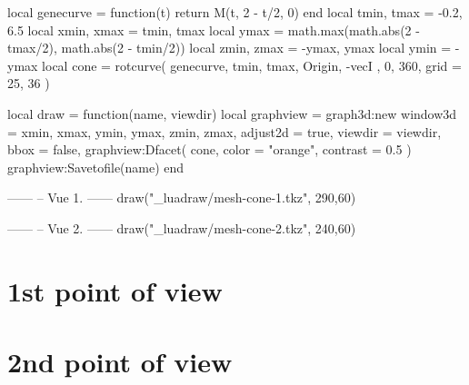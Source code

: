\documentclass[varwidth]{standalone}
\begin{document}
\begin{luacode*}
local genecurve = function(t)
  return M(t, 2 - t/2, 0)
end
local tmin, tmax = -0.2, 6.5
local xmin, xmax = tmin, tmax
local ymax = math.max(math.abs(2 - tmax/2), math.abs(2 - tmin/2))
local zmin, zmax = -ymax, ymax
local ymin = -ymax
local cone = rotcurve(
  genecurve, tmin, tmax,
  {
    Origin, -vecI
  },
  0, 360,
  {
    grid = {25, 36}
  }
)

local draw = function(name, viewdir)
    local graphview = graph3d:new{
      window3d = {xmin, xmax, ymin, ymax, zmin, zmax},
      adjust2d = true,
      viewdir = viewdir,
      bbox     = false,
    }
    graphview:Dfacet(
        cone,
        {
          color  = "orange",
          contrast = 0.5
        }
    )
    graphview:Savetofile(name)
end

------
-- Vue 1.
------
draw("_luadraw/mesh-cone-1.tkz", {290,60})

------
-- Vue 2.
------
draw("_luadraw/mesh-cone-2.tkz", {240,60})
\end{luacode*}

\section*{1st point of view}



\section*{2nd point of view}


\end{document}
